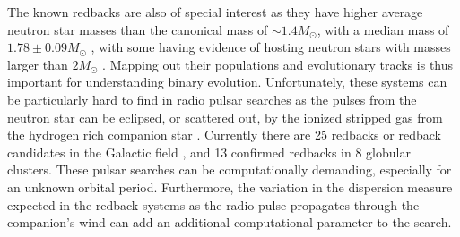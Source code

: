 \documentclass[fleqn,usenatbib,useAMS,letters]{mnras}
\begin{document}

The known redbacks are also of special interest as 
they 
have higher average neutron star masses than the canonical mass of $\sim 1.4M_\odot$, with a median mass of $1.78 \pm 0.09 M_{\odot}$ \citep{Strader2019Redbacks}, with some having evidence of hosting neutron stars with masses larger than $2 M_\odot$ \citep{Linares2018,Strader2019Redbacks,Kandel20}. Mapping out their populations and evolutionary tracks is thus important for understanding binary evolution. Unfortunately, these systems can be particularly hard to find in radio pulsar searches as the pulses from the neutron star can be eclipsed, or scattered out, by the ionized stripped gas from the hydrogen rich companion star \cite[e.g.][]{FruchterEclipse1988}. Currently there are 25 redbacks or redback candidates in the Galactic field \citep{Strader2019Redbacks,2020SwihartRedback}, and %
13 confirmed redbacks in 8 globular clusters. These pulsar searches can be computationally demanding, especially for an unknown orbital period. Furthermore, the variation in the dispersion measure expected in the redback systems as the radio pulse propagates through the companion's wind can add an additional computational parameter %
to the search. 






\end{document}
